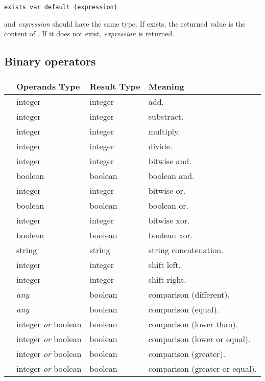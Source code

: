  
\begin{lstlisting}[language=goilTemplate]
exists var default (expression)
\end{lstlisting}

 and {\em expression} should have the same type. If  exists, the returned value is the content of . If it does not exist, {\em expression} is returned.


\subsection{Binary operators}

\begin{longtable}{>{\ttfamily}c|l|l|p{2.47in}}
{\bf Operator}&{\bf Operands Type}&{\bf Result Type}&{\bf Meaning}\\
\hline\endhead
 {+}&
  {integer}&
  {integer}&
  {add.}\\
 {-}&
  {integer}&
  {integer}&
  {substract.}\\
 {*}&
  {integer}&
  {integer}&
  {multiply.}\\
 {/}&
  {integer}&
  {integer}&
  {divide.}\\
 {\&}&
  {integer}&
  {integer}&
  {bitwise and.}\\
 {\&}&
  {boolean}&
  {boolean}&
  {boolean and.}\\
 {$\mid$}&
  {integer}&
  {integer}&
  {bitwise or.}\\
 {$\mid$}&
  {boolean}&
  {boolean}&
  {boolean or.}\\
 {$\wedge$}&
  {integer}&
  {integer}&
  {bitwise xor.}\\
 {$\wedge$}&
  {boolean}&
  {boolean}&
  {boolean xor.}\\
 {.}&
  {string}&
  {string}&
  {string concatenation.}\\
 {$<<$}&
  {integer}&
  {integer}&
  {shift left.}\\
 {$>>$}&
  {integer}&
  {integer}&
  {shift right.}\\
 {!=}&
  {{\em any}}&
  {boolean}&
  {comparison (different).}\\
 {==}&
  {{\em any}}&
  {boolean}&
  {comparison (equal).}\\
 {$<$}&
  {integer {\em or} boolean}&
  {boolean}&
  {comparison (lower than).}\\
 {$<=$}&
  {integer {\em or} boolean}&
  {boolean}&
  {comparison (lower or equal).}\\
 {$>$}&
  {integer {\em or} boolean}&
  {boolean}&
  {comparison (greater).}\\
 {$>=$}&
  {integer {\em or} boolean}&
  {boolean}&
  {comparison (greater or equal).}\\
\end{longtable}

